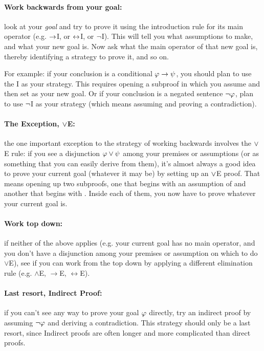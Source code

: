 \paragraph{Work backwards from your goal:} look at your \emph{goal} and try to prove it using the introduction rule for its main operator (e.g. $\rightarrow$I, or $\leftrightarrow$I, or $\neg$I).  This will tell you what assumptions to make, and what your new goal is. Now ask what the main operator of that new goal is, thereby identifying a strategy to prove it, and so on.


For example: if your conclusion is a conditional $\mathcal{\varphi}\rightarrow\mathcal{\psi}$, you should plan to use the {\eif}I as your strategy. This requires opening a subproof in which you assume \meta{\varphi} and then set \meta{\psi} as your new goal.  Or if your conclusion is a negated sentence $\neg \mathcal{\varphi}$, plan to use $\neg$I as your strategy (which means assuming \meta{\varphi} and proving a contradiction).


\paragraph{The Exception, $\vee$E:} the one important exception to the strategy of working backwards involves the $\vee$E rule: if you see a disjunction $\mathcal{\varphi} \vee \mathcal{\psi}$ among your premises or assumptions (or as something that you can easily derive from them), it's almost always a good idea to prove your current goal (whatever it may be) by setting up an $\vee$E proof.  That means opening up two subproofs, one that begins with an assumption of \meta{\varphi} and another that begins with \meta{\psi}.  Inside each of them, you now have to prove whatever your current goal is.

\paragraph{Work top down:} if neither of the above applies (e.g. your current goal has no main operator, and you don't have a disjunction among your premises or assumption on which to do $\lor$E), see if you can work from the top down by applying a different elimination rule (e.g. $\land$E, $\rightarrow$E, $\leftrightarrow$E).

\paragraph{Last resort, Indirect Proof:} if you can't see any way to prove your goal $\mathcal{\varphi}$ directly, try an indirect proof by assuming $\neg \mathcal{\varphi}$ and deriving  a contradiction. This strategy should only be  a last resort, since Indirect proofs are often longer and more complicated than direct proofs.

